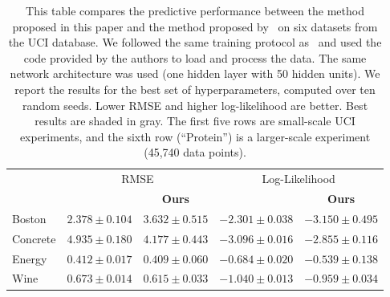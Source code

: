 \begin{appendices}
\setlength{\tabcolsep}{11pt}
\begin{table}[htb!]
\vspace*{-10pt}
\small
\centering
\caption{
    This table compares the predictive performance between the method proposed in this paper and the method proposed by~\citet{sun2019fbnn} on six datasets from the UCI database.
    We followed the same training protocol as~\citet{sun2019fbnn} and used the code provided by the authors to load and process the data.
    The same network architecture was used (one hidden layer with 50 hidden units).
    We report the results for the best set of hyperparameters, computed over ten random seeds.
    Lower RMSE and higher log-likelihood are better.
    Best results are shaded in gray.
    The first five rows are small-scale UCI experiments, and the sixth row (``Protein'') is a larger-scale experiment (45,740 data points).
}
\begin{tabular}{lllll}
\midrule
\midrule
         & \multicolumn{2}{c}{RMSE}                                      & \multicolumn{2}{c}{Log-Likelihood}                            \\
         & \multicolumn{1}{c}{\citet{sun2019fbnn}} & \multicolumn{1}{c}{\textbf{Ours}} & \multicolumn{1}{c}{\citet{sun2019fbnn}} & \multicolumn{1}{c}{\textbf{Ours}} \\
\midrule
Boston   & \cellcolor[gray]{0.9} \hspace*{-5pt}$\mathbf{2.378 \pm 0.104}$                & \hspace*{5pt}$3.632 \pm 0.515$                  & \hspace*{-5pt}\cellcolor[gray]{0.9} $\mathbf{-2.301 \pm 0.038}$               & \hspace*{5pt}$-3.150 \pm 0.495$                 \\
Concrete & $4.935 \pm 0.180$                    & \cellcolor[gray]{0.9} $\mathbf{4.177 \pm 0.443}$              & $-3.096 \pm 0.016$                   & \cellcolor[gray]{0.9} $\mathbf{-2.855 \pm 0.116}$             \\
Energy   & $0.412 \pm 0.017$                    & \cellcolor[gray]{0.9} $\mathbf{0.409 \pm 0.060}$              & $-0.684 \pm 0.020$                   & \cellcolor[gray]{0.9}\hspace*{2.5pt}$\mathbf{-0.539 \pm 0.138}$             \\
Wine     & $0.673 \pm 0.014$                    & \cellcolor[gray]{0.9} $\mathbf{0.615 \pm 0.033}$              & $-1.040 \pm 0.013$                   & \cellcolor[gray]{0.9} $\mathbf{-0.959 \pm 0.034}$             \\

\end{tabular}
\end{table}
\end{appendices}

